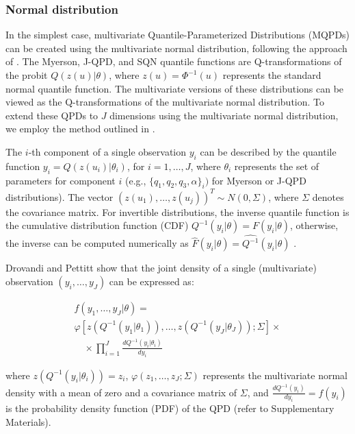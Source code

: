 \documentclass[
  fleqn,
  deca,
  blindrev
]{informs4}
\begin{document}
\subsubsection{Normal distribution}\label{normal-distribution}

In the simplest case, multivariate Quantile-Parameterized Distributions
(MQPDs) can be created using the multivariate normal distribution,
following the approach of \citet{hoff2007ExtendingRankLikelihood}. The
Myerson, J-QPD, and SQN quantile functions are Q-transformations of the
probit \(Q(z(u)\vert\theta)\), where \(z(u)=\Phi^{-1}(u)\) represents
the standard normal quantile function. The multivariate versions of
these distributions can be viewed as the Q-transformations of the
multivariate normal distribution. To extend these QPDs to \(J\)
dimensions using the multivariate normal distribution, we employ the
method outlined in \citet{drovandi2011LikelihoodfreeBayesianEstimation}.

The \(i\)-th component of a single observation \(y_i\) can be described
by the quantile function \(y_i=Q(z(u_i)\vert\theta_i)\), for
\(i=1,\dots,J\), where \(\theta_i\) represents the set of parameters for
component \(i\) (e.g., \(\{q_1,q_2,q_3, \alpha\}_i)\) for Myerson or
J-QPD distributions). The vector
\((z(u_1),\dots,z(u_j))^T\sim N(0,\Sigma)\), where \(\Sigma\) denotes
the covariance matrix. For invertible distributions, the inverse
quantile function is the cumulative distribution function (CDF)
\(Q^{-1}(y_i\vert\theta)=F(y_i\vert\theta)\), otherwise, the inverse can
be computed numerically as
\(\widehat{F}(y_i\vert\theta)=\widehat{Q^{-1}}(y_i\vert\theta)\)
\citep{perepolkin2023TenetsQuantilebasedInference}.

Drovandi and Pettitt
\citep{drovandi2011LikelihoodfreeBayesianEstimation} show that the joint
density of a single (multivariate) observation \((y_i,\dots,y_J)\) can
be expressed as:

\[
\begin{gathered}
f(y_1,\dots,y_J\vert\theta)=\\
\varphi\left[z(Q^{-1}(y_1\vert\theta_1)),\dots,z(Q^{-1}(y_J\vert\theta_J));\Sigma\right]\times\\
\quad \times\prod_{i=1}^{J}\frac{dQ^{-1}(y_i\vert\theta_i)}{dy_i}
\end{gathered}
\]

where \(z(Q^{-1}(y_i\vert\theta_i))=z_i\),
\(\varphi(z_1,\dots,z_J;\Sigma)\) represents the multivariate normal
density with a mean of zero and a covariance matrix of \(\Sigma\), and
\(\frac{dQ^{-1}(y_i)}{dy_i}=f(y_i)\) is the probability density function
(PDF) of the QPD (refer to Supplementary Materials).
\end{document}
